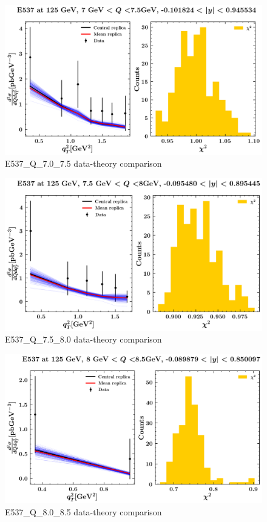 \documentclass[]{article}
\begin{document}
\begin{figure}
\centering
\includegraphics{pngplots/E537_Q_7.0_7.5.png}
\caption{E537\_Q\_7.0\_7.5 data-theory comparison}
\end{figure}

\begin{figure}
\centering
\includegraphics{pngplots/E537_Q_7.5_8.0.png}
\caption{E537\_Q\_7.5\_8.0 data-theory comparison}
\end{figure}

\begin{figure}
\centering
\includegraphics{pngplots/E537_Q_8.0_8.5.png}
\caption{E537\_Q\_8.0\_8.5 data-theory comparison}
\end{figure}
\end{document}

